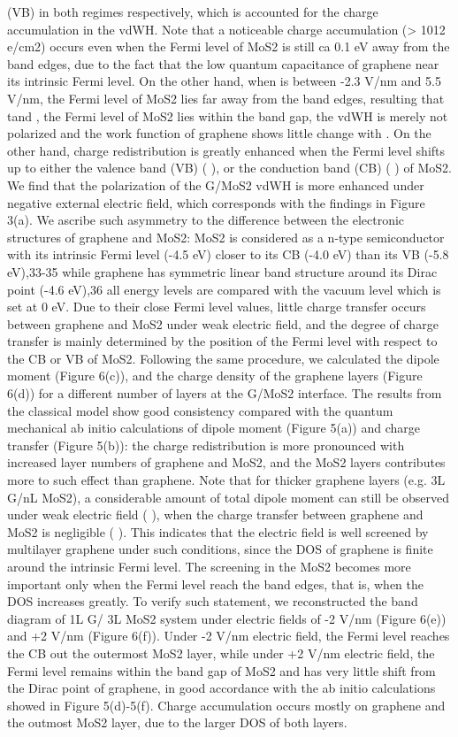 (VB) in both regimes respectively, which is accounted for the charge accumulation in the vdWH. Note that a noticeable charge accumulation (> 1012 e/cm2) occurs even when the Fermi level of MoS2 is still ca 0.1 eV away from the band edges, due to the fact that the low quantum capacitance of graphene near its intrinsic Fermi level. On the other hand, when    is between -2.3 V/nm and 5.5 V/nm, the Fermi level of MoS2 lies far away from the band edges, resulting that tand  , the Fermi level of MoS2 lies within the band gap, the vdWH is merely not polarized and the work function of graphene  shows little change with  . On the other hand, charge redistribution is greatly enhanced when the Fermi level shifts up to either the valence band (VB)  ( ), or the conduction band (CB) ( ) of MoS2. We find that the polarization of the G/MoS2 vdWH is more enhanced under negative external electric field, which corresponds with the findings in Figure 3(a). We ascribe such asymmetry to the difference between the electronic structures of graphene and MoS2: MoS2 is considered as a n-type semiconductor with its intrinsic Fermi level (-4.5 eV) closer to its CB (-4.0 eV) than its VB (-5.8 eV),33-35 while graphene has symmetric linear band structure around its Dirac point (-4.6 eV),36 all energy levels are compared with the vacuum level which is set at 0 eV.  Due to their close Fermi level values, little charge transfer occurs between graphene and MoS2 under weak electric field, and the degree of charge transfer is mainly determined by the position of the Fermi level with respect to the CB or VB of MoS2. Following the same procedure, we calculated the dipole moment  (Figure 6(c)), and the charge density of the graphene layers   (Figure 6(d)) for a different number of layers at the G/MoS2 interface. The results from the classical model show good consistency compared with the quantum mechanical ab initio calculations of dipole moment (Figure 5(a)) and charge transfer (Figure 5(b)): the charge redistribution is more pronounced with increased layer numbers of graphene and MoS2, and the MoS2 layers contributes more to such effect than graphene. Note that for thicker graphene layers (e.g. 3L G/nL MoS2), a considerable amount of total dipole moment can still be observed under weak electric field ( ), when the charge transfer between graphene and MoS2 is negligible ( ). This indicates that the electric field is well screened by multilayer graphene under such conditions, since the DOS of graphene is finite around the intrinsic Fermi level. The screening in the MoS2 becomes more important only when the Fermi level reach the band edges, that is, when the DOS increases greatly. To verify such statement, we reconstructed the band diagram of 1L G/ 3L MoS2 system under electric fields of -2 V/nm (Figure 6(e)) and +2 V/nm (Figure 6(f)). Under -2 V/nm electric field, the Fermi level reaches the CB out the outermost MoS2 layer, while under +2 V/nm electric field, the Fermi level remains within the band gap of MoS2 and has very little shift from the Dirac point of graphene, in good accordance with the ab initio calculations showed in Figure 5(d)-5(f). Charge accumulation occurs mostly on graphene and the outmost MoS2 layer, due to the larger DOS of both layers.
